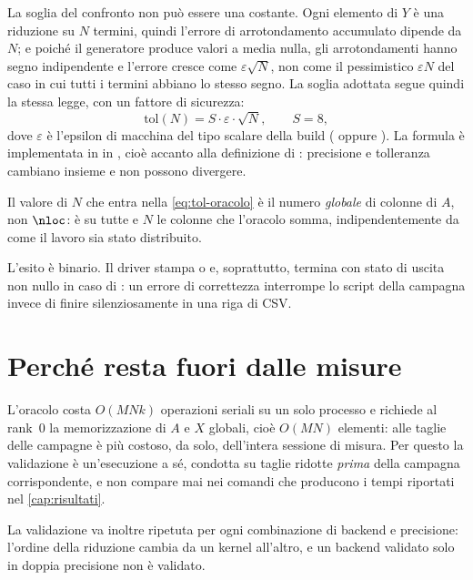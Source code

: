 La soglia del confronto non può essere una costante. Ogni elemento di $Y$ è una
riduzione su $N$ termini, quindi l'errore di arrotondamento accumulato dipende
da $N$; e poiché il generatore produce valori a media nulla, gli arrotondamenti
hanno segno indipendente e l'errore cresce come $\varepsilon\sqrt{N}$, non come
il pessimistico $\varepsilon N$ del caso in cui tutti i termini abbiano lo
stesso segno. La soglia adottata segue quindi la stessa legge, con un fattore
di sicurezza:
\begin{equation}
  \mathrm{tol}(N) = S \cdot \varepsilon \cdot \sqrt{N},
  \qquad S = 8,
  \label{eq:tol-oracolo}
\end{equation}
dove $\varepsilon$ è l'epsilon di macchina del tipo scalare della build
( oppure ). La formula è implementata in
 in , cioè accanto alla
definizione di : precisione e tolleranza cambiano insieme e non
possono divergere.

Il valore di $N$ che entra nella \cref{eq:tol-oracolo} è il numero
\emph{globale} di colonne di $A$, non $\nloc$: è su tutte e $N$ le colonne che
l'oracolo somma, indipendentemente da come il lavoro sia stato distribuito.

L'esito è binario. Il driver stampa  o  e, soprattutto,
termina con stato di uscita non nullo in caso di : un errore di
correttezza interrompe lo script della campagna invece di finire silenziosamente
in una riga di CSV.

\section{Perché resta fuori dalle misure}
\label{sec:oracolo-costo}

L'oracolo costa $O(MNk)$ operazioni seriali su un solo processo e richiede al
rank~0 la memorizzazione di $A$ e $X$ globali, cioè $O(MN)$ elementi: alle
taglie delle campagne è più costoso, da solo, dell'intera sessione di misura.
Per questo la validazione è un'esecuzione a sé, condotta su taglie ridotte
\emph{prima} della campagna corrispondente, e  non compare mai
nei comandi che producono i tempi riportati nel \cref{cap:risultati}.

La validazione va inoltre ripetuta per ogni combinazione di backend e
precisione: l'ordine della riduzione cambia da un kernel all'altro, e un
backend validato solo in doppia precisione non è validato.
